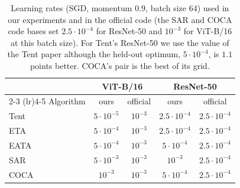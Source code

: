 \begin{table}[t]
    \centering
    \small
    \caption{Learning rates (SGD, momentum $0.9$, batch size $64$) used in our experiments and in the official code (the SAR and COCA code bases set $2.5{\cdot}10^{-4}$ for ResNet-50 and $10^{-3}$ for ViT-B/16 at this batch size).
    For Tent's ResNet-50 we use the value of the Tent paper although the held-out optimum, $5{\cdot}10^{-4}$, is $1.1$ points better. COCA's pair is the best of its grid.}
    \label{tab:hparams}
    \begin{tabular}{lcccc}
        \toprule
        & \multicolumn{2}{c}{ViT-B/16} & \multicolumn{2}{c}{ResNet-50} \\
        \cmidrule(lr){2-3} \cmidrule(lr){4-5}
        Algorithm & ours & official & ours & official \\
        \midrule
        Tent & $5{\cdot}10^{-5}$ & $10^{-3}$ & $2.5{\cdot}10^{-4}$ & $2.5{\cdot}10^{-4}$ \\
        ETA  & $5{\cdot}10^{-4}$ & $10^{-3}$ & $2.5{\cdot}10^{-4}$ & $2.5{\cdot}10^{-4}$ \\
        EATA & $5{\cdot}10^{-4}$ & $10^{-3}$ & $5{\cdot}10^{-4}$   & $2.5{\cdot}10^{-4}$ \\
        SAR  & $5{\cdot}10^{-3}$ & $10^{-3}$ & $10^{-3}$           & $2.5{\cdot}10^{-4}$ \\
        COCA & $10^{-3}$         & $10^{-3}$ & $5{\cdot}10^{-4}$   & $2.5{\cdot}10^{-4}$ \\
        \bottomrule
    \end{tabular}
\end{table}
